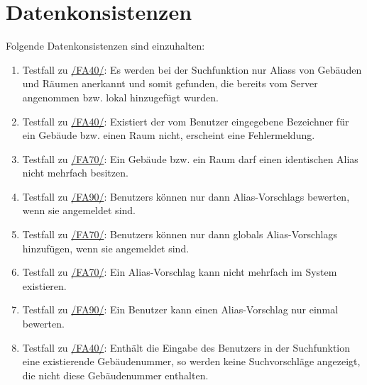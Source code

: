\section{Datenkonsistenzen}

Folgende Datenkonsistenzen sind einzuhalten:
\begin{enumerate}[label=\textbf{/T\arabic*0/}, align=left, resume]
	\item \label{/T300/} Testfall zu \hyperref[/FA40/]{/FA40/}: Es werden bei der Suchfunktion nur \Glspl{Alias} von Gebäuden und Räumen anerkannt und somit gefunden, die bereits vom \Gls{Server} angenommen bzw. \gls{lokal} hinzugefügt wurden.
	\item \label{/T310/} Testfall zu \hyperref[/FA40/]{/FA40/}: Existiert der vom \Gls{Benutzer} eingegebene Bezeichner für ein Gebäude bzw. einen Raum nicht, erscheint eine Fehlermeldung.
	\item \label{/T320/} Testfall zu \hyperref[/FA70/]{/FA70/}: Ein Gebäude bzw. ein Raum darf einen identischen Alias nicht mehrfach besitzen.
	\item \label{/T330/} Testfall zu \hyperref[/FA90/]{/FA90/}: \Glspl{Benutzer} können nur dann \Glspl{Alias-Vorschlag} bewerten, wenn sie angemeldet sind.
	\item \label{/T340/} Testfall zu \hyperref[/FA70/]{/FA70/}: \Glspl{Benutzer} können nur dann \glspl{global} \Glspl{Alias-Vorschlag} hinzufügen, wenn sie angemeldet sind.
	\item \label{/T350/} Testfall zu \hyperref[/FA70/]{/FA70/}: Ein \Gls{Alias-Vorschlag} kann nicht mehrfach im System existieren.
	\item \label{/T360/} Testfall zu \hyperref[/FA90/]{/FA90/}: Ein \Gls{Benutzer} kann einen \Gls{Alias-Vorschlag} nur einmal bewerten.
	\item \label{/T370/} Testfall zu \hyperref[/FA40/]{/FA40/}: Enthält die Eingabe des \Gls{Benutzer}s in der Suchfunktion eine existierende Gebäudenummer, so werden keine Suchvorschläge angezeigt, die nicht diese Gebäudenummer enthalten.
\end{enumerate}